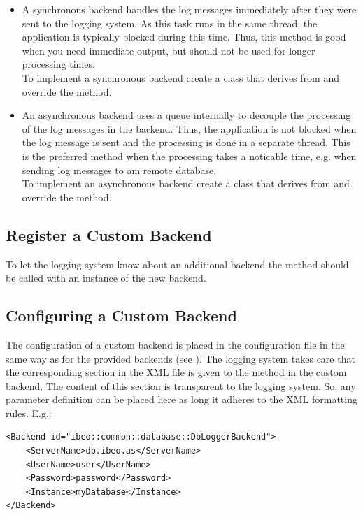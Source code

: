 \begin{itemize}
	\item A synchronous backend handles the log messages immediately after they were sent to the logging system. As this task runs in the same thread, the application is typically blocked during this time. Thus, this method is good when you need immediate output, but should not be used for longer processing times.\\
	To implement a synchronous backend create a class that derives from  and override the  method.
	\item An asynchronous backend uses a queue internally to decouple the processing of the log messages in the backend. Thus, the application is not blocked when the log message is sent and the processing is done in a separate thread. This is the preferred method when the processing takes a noticable time, e.g. when sending log messages to am remote database.\\
	To implement an asynchronous backend create a class that derives from  and override the  method.
\end{itemize}

\subsection{Register a Custom Backend}
To let the logging system know about an additional backend the method  should be called with an instance of the new backend.

\subsection{Configuring a Custom Backend}
The configuration of a custom backend is placed in the configuration file in the same way as for the provided backends (see ). The logging system takes care that the corresponding section in the XML file is given to the  method in the custom backend. The content of this section is transparent to the logging system. So, any parameter definition can be placed here as long it adheres to the XML formatting rules.
E.g.:
\begin{lstlisting}[numbers=none]
<Backend id="ibeo::common::database::DbLoggerBackend">
	<ServerName>db.ibeo.as</ServerName>
	<UserName>user</UserName>
	<Password>password</Password>
	<Instance>myDatabase</Instance>
</Backend>
\end{lstlisting}

